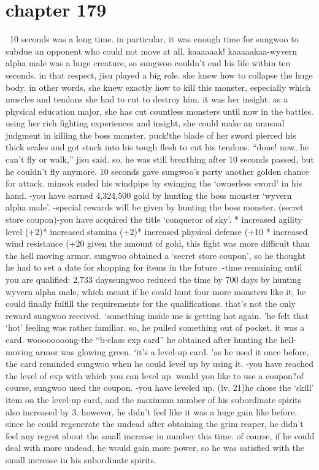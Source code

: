\section{chapter 179}






 10 seconds was a long time.
 in particular, it was enough time for sungwoo to subdue an opponent who could not move at all.
kaaaaaak! kaaaaakaa-wyvern alpha male was a huge creature, so sungwoo couldn’t end his life within ten seconds.
 in that respect, jisu played a big role.
she knew how to collapse the huge body.
 in other words, she knew exactly how to kill this monster, especially which muscles and tendons she had to cut to destroy him.
it was her insight.
 as a physical education major, she has cut countless monsters until now in the battles.
 using her rich fighting experiences and insight, she could make an unusual judgment in killing the boss monster.
puck!the blade of her sword pierced his thick scales and got stuck into his tough flesh to cut his tendons.
“done! now, he can’t fly or walk,” jisu said.
so, he was still breathing after 10 seconds passed, but he couldn’t fly anymore.
10 seconds gave sungwoo’s party another golden chance for attack.
 minsok ended his windpipe by swinging the ‘ownerless sword’ in his hand.
-you have earned 4,324,500 gold by hunting the boss monster ‘wyvern alpha male’.
-special rewards will be given by hunting the boss monster.
 (secret store coupon)-you have acquired the title ‘conqueror of sky’.
* increased agility level (+2)* increased stamina (+2)* increased physical defense (+10%
* increased wind resistance (+20%
 given the amount of gold, this fight was more difficult than the hell moving armor.
sungwoo obtained a ‘secret store coupon’, so he thought he had to set a date for shopping for items in the future.
-time remaining until you are qualified: 2,733 dayssungwoo reduced the time by 700 days by hunting wyvern alpha male, which meant if he could hunt four more monsters like it, he could finally fulfill the requirements for the qualifications.
that’s not the only reward sungwoo received.
‘something inside me is getting hot again.
’he felt that ‘hot’ feeling was rather familiar.
 so, he pulled something out of pocket.
 it was a card.
woooooooong-the “b-class exp card” he obtained after hunting the hell-moving armor was glowing green.
‘it’s a level-up card.
’as he used it once before, the card reminded sungwoo when he could level up by using it.
-you have reached the level of exp with which you can level up.
 would you like to use a coupon?of course, sungwoo used the coupon.
-you have leveled up.
 (lv.
 21)he chose the ‘skill’ item on the level-up card, and the maximum number of his subordinate spirits also increased by 3.
however, he didn’t feel like it was a huge gain like before.
 since he could regenerate the undead after obtaining the grim reaper, he didn’t feel any regret about the small increase in number this time.
 of course, if he could deal with more undead, he would gain more power, so he was satisfied with the small increase in his subordinate spirits.

